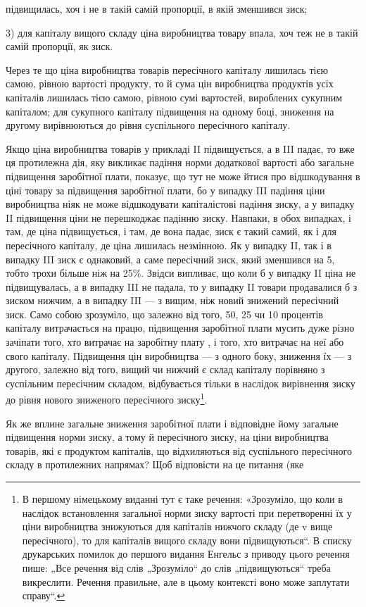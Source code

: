\parcont{}  %
підвищилась, хоч і не в такій самій пропорції, в якій зменшився
зиск;

3) для капіталу вищого складу ціна виробництва товару впала,
хоч теж не в такій самій пропорції, як зиск.

Через те що ціна виробництва товарів пересічного капіталу
лишилась тією самою, рівною вартості продукту, то й сума цін
виробництва продуктів усіх капіталів лишилась тією самою,
рівною сумі вартостей, вироблених сукупним капіталом; для
сукупного капіталу підвищення на одному боці, зниження на
другому вирівнюються до рівня суспільного пересічного капіталу.

Якщо ціна виробництва товарів у прикладі II підвищується,
а в III падає, то вже ця протилежна дія, яку викликає падіння
норми додаткової вартості або загальне підвищення заробітної
плати, показує, що тут не може йтися про відшкодування в
ціні товару за підвищення заробітної плати, бо у випадку III падіння
ціни виробництва ніяк не може відшкодувати капіталістові
падіння зиску, а у випадку II підвищення ціни не перешкоджає
падінню зиску. Навпаки, в обох випадках, і там, де ціна підвищується,
і там, де вона падає, зиск є такий самий, як і для
пересічного капіталу, де ціна лишилась незмінною. Як у випадку
II, так і в випадку III зиск є однаковий, а саме пересічний
зиск, який зменшився на 5, тобто трохи більше ніж на 25\%.
Звідси випливає, що коли б у випадку II ціна не підвищувалась,
а в випадку III не падала, то у випадку II товари продавалися б
з зиском нижчим, а в випадку III — з вищим, ніж новий знижений
пересічний зиск. Само собою зрозуміло, що залежно від
того, 50, 25 чи 10 процентів капіталу витрачається на працю,
підвищення заробітної плати мусить дуже різно зачіпати
того, хто витрачає на заробітну плату , і того, хто витрачає
на неї  або  свого капіталу. Підвищення цін виробництва
— з одного боку, зниження їх — з другого, залежно від
того, вищий чи нижчий є склад капіталу порівняно з суспільним
пересічним складом, відбувається тільки в наслідок вирівнення
зиску до рівня нового зниженого пересічного зиску\footnote*{
В першому німецькому виданні тут є таке речення: «Зрозуміло, що коли
в наслідок встановлення загальної норми зиску вартості при перетворенні їх
у ціни виробництва знижуються для капіталів нижчого складу (де v вище пересічного),
то для капіталів вищого складу вони підвищуються“. В списку друкарських
помилок до першого видання Енгельс з приводу цього речення
пише: „Все речення від слів „Зрозуміло“ до слів „підвищуються“ треба викреслити.
Речення правильне, але в цьому контексті воно може заплутати
справу“. 
}.

Як же вплине загальне зниження заробітної плати і відповідне
йому загальне підвищення норми зиску, а тому й пересічного
зиску, на ціни виробництва товарів, які є продуктом
капіталів, що відхиляються від суспільного пересічного складу
в протилежних напрямах? Щоб відповісти на це питання (яке
\parbreak{}  %
